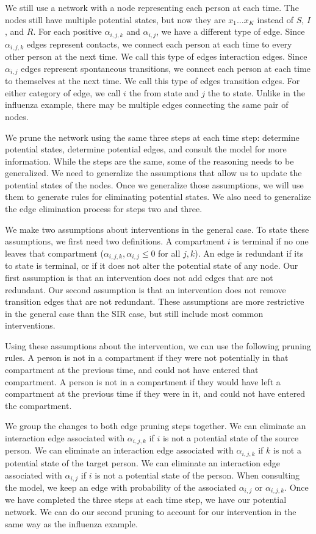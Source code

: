 \documentclass[PTRSB]{rsos}
\begin{document}
\begin{multicols}{2}
We still use a network with a node representing each person at each time.
The nodes still have multiple potential states, but now they are $x_1 \dots x_K$ instead of $S$, $I$, and $R$.
For each positive $\alpha_{i,j,k} $ and $\alpha_{i,j}$, we have a different type of edge.
Since $\alpha_{i,j,k}$ edges represent contacts, we connect each person at each time to every other person at the next time.
We call this type of edges interaction edges.
Since $\alpha_{i,j}$ edges represent spontaneous transitions, we connect each person at each time to themselves at the next time.
We call this type of edges transition edges.
For either category of edge, we call $i$ the from state and $j$ the to state.
Unlike in the influenza example, there may be multiple edges connecting the same pair of nodes.

We prune the network using the same three steps at each time step: determine potential states, determine potential edges, and consult the model for more information.
While the steps are the same, some of the reasoning needs to be generalized.
We need to generalize the assumptions that allow us to update the potential states of the nodes.
Once we generalize those assumptions, we will use them to generate rules for eliminating potential states.
We also need to generalize the edge elimination process for steps two and three.

We make two assumptions about interventions in the general case.
To state these assumptions, we first need two definitions.
A compartment $i$ is terminal if no one leaves that compartment ($\alpha_{i,j,k},\alpha_{i,j} \leq 0$ for all $j,k$).
An edge is redundant if its to state is terminal, or if it does not alter the potential state of any node.
Our first assumption is that an intervention does not add edges that are not redundant.
Our second assumption is that an intervention does not remove transition edges that are not redundant.
These assumptions are more restrictive in the general case than the SIR case, but still include most common interventions.

Using these assumptions about the intervention, we can use the following pruning rules.
A person is not in a compartment if they were not potentially in that compartment at the previous time, and could not have entered that compartment.
A person is not in a compartment if they would have left a compartment at the previous time if they were in it, and could not have entered the compartment.

We group the changes to both edge pruning steps together.
We can eliminate an interaction edge associated with $\alpha_{i,j,k}$ if $i$ is not a potential state of the source person.
We can eliminate an interaction edge associated with $\alpha_{i,j,k}$ if $k$ is not a potential state of the target person.
We can eliminate an interaction edge associated with $\alpha_{i,j}$ if $i$ is not a potential state of the person.
When consulting the model, we keep an edge with probability of the associated $\alpha_{i,j}$ or $\alpha_{i,j,k}$.
Once we have completed the three steps at each time step, we have our potential network.
We can do our second pruning to account for our intervention in the same way as the influenza example.


\end{multicols}
\end{document}
